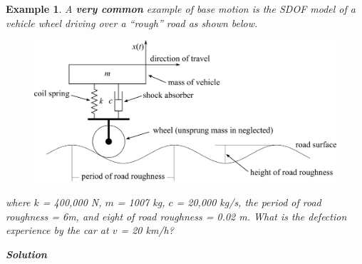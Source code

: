 \documentclass[12pt,letter]{article}
\newtheorem{ex}{Example}
\numberwithin{ex}{section} %
\newenvironment{example}{\begin{mdframed}[middlelinewidth=0.5mm]\begin{ex}\normalfont}{\end{ex}\end{mdframed}}
\begin{document}
\begin{example}

			A \textbf{very common} example of base motion is the SDOF model of a vehicle wheel driving over a ``rough'' road as shown below. 
			\begin{figure}[H]
				\centering
				\includegraphics[]{../Figures/Vehicle_on_road_example.png}
			\end{figure}				
			where $k$ = 400,000 N, $m$ = 1007 kg, $c$ = 20,000 kg/s, the period of road roughness = 6m, and eight of road roughness = 0.02 m. What is the defection experience by the car at $v$ = 20 km/h?
			
			\textbf{Solution}


\end{example}
\end{document}
